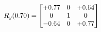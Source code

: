 \documentclass[preview]{standalone}
\begin{document}
\begin{align*}
\special{dvisvgm:raw <g id='unique000'>}R_{y}(0.70) = \begin{bmatrix}+0.77 & 0 & +0.64 \\0 & 1 & 0 \\-0.64 & 0 & +0.77\end{bmatrix}\special{dvisvgm:raw </g>}
\end{align*}
\end{document}
